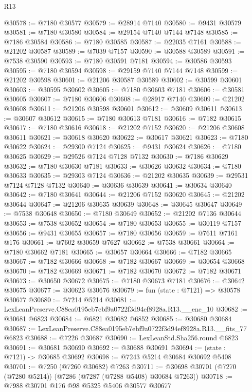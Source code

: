 \begin{lexlean}{R13}
\begin{coremodule}
@30578 := @7180 @30577
@30579 := @28914 @7140
@30580 := @9431 @30579
@30581 := @7180 @30580
@30584 := @29154 @7140 @7144 @7148
@30585 := @7186 @30584
@30586 := @7180 @30585
@30587 := @22035 @7161
@30588 := @21202 @30587
@30589 := @7039 @7157
@30590 := @30588 @30589
@30591 := @7538 @30590
@30593 := @7180 @30591 @7181
@30594 := @30586 @30593
@30595 := @7180 @30594
@30598 := @29159 @7140 @7144 @7148
@30599 := @21202 @30598
@30601 := @21206 @30587 @30589
@30602 := @30599 @30601
@30603 := @30595 @30602
@30605 := @7180 @30603 @7181
@30606 := @30581 @30605
@30607 := @7180 @30606
@30608 := @28917 @7140
@30609 := @21202 @30608
@30611 := @21206 @30598 @30601
@30612 := @30609 @30611
@30613 := @30607 @30612
@30615 := @7180 @30613 @7181
@30616 := @7182 @30615
@30617 := @7180 @30616
@30618 := @21202 @7152
@30620 := @21206 @30608 @30611
@30621 := @30618 @30620
@30622 := @30617 @30621
@30623 := @7180 @30622
@30624 := @29300 @7124
@30625 := @9431 @30624
@30626 := @7180 @30625
@30629 := @29526 @7124 @7128 @7132
@30630 := @7186 @30629
@30632 := @7180 @30630 @7181
@30633 := @30626 @30632
@30634 := @7180 @30633
@30635 := @29303 @7124
@30636 := @21202 @30635
@30639 := @29531 @7124 @7128 @7132
@30640 := @30636 @30639
@30641 := @30634 @30640
@30642 := @7180 @30641
@30644 := @21206 @7152 @30620
@30645 := @21202 @30644
@30647 := @21206 @30635 @30639
@30648 := @30645 @30647
@30649 := @7538 @30648
@30650 := @7180 @30649
@30652 := @21202 @7136 @30644
@30653 := @7538 @30652
@30654 := @7180 @30653
@30655 := @30119 @7157
@30656 := @9431 @30655
@30657 := @7180 @30656
@30659 := @7611 @7161 @176
@30661 := @7602 @30659 @7627
@30662 := @7538 @30661
@30664 := @7180 @30662 @7181
@30665 := @30657 @30664
@30666 := @7182 @30665
@30667 := @7182 @30666
@30668 := @7182 @30667
@30669 := @30654 @30668
@30670 := @7182 @30669
@30671 := @7182 @30670
@30672 := @7182 @30671
@30673 := @30650 @30672
@30675 := @7180 @30673 @7181
@30676 := @30642 @30675
@30677 := @30623 @30676
@30679 := fun (state : @7121) => @30578 @30677
@30680 := @7214 @5214
@30681 := LexLeanPreserve.C88ea0195eb7ebf9a0722f3d94ef8928a.R13.__enc_10
@30682 := @30681 @6823
@30684 := @6821 @30682 @6852
@30685 := @30680 @30684
@30687 := LexLeanPreserve.C88ea0195eb7ebf9a0722f3d94ef8928a.R13.__fits_77 @6823
@30688 := @7226 @30687
@30690 := LexLeanStd.Sha256.round @6823
@30691 := @30681 @30690
@30692 := @30688 @30691
@30694 := (state : @7121) -> @30685 @30692
@30698 := @7243 @5214 @30684 @30692 @5408
@30701 := @7250 (@7260 @30682) @7263
@30711 := @30698 @30701 (@7270 (@7280 @5214)) (@7286 (@7287 (@7288 @5408) @30684 @7263))
@30718 := @7988 @30701 @176 @98 @5325 @5406 @30577 @30677

\end{coremodule}
\end{lexlean}
